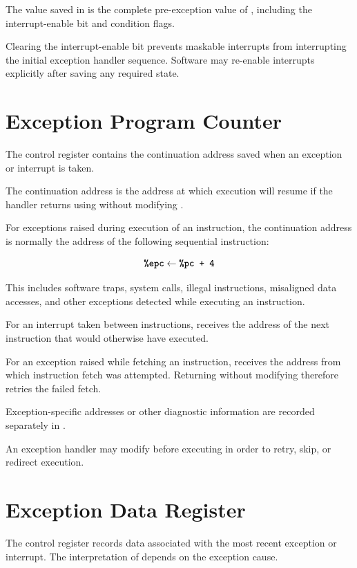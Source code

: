 The value saved in  is the complete pre-exception value of
, including the interrupt-enable bit and condition flags.

\noindent
Clearing the interrupt-enable bit prevents maskable interrupts from
interrupting the initial exception handler sequence. Software may
re-enable interrupts explicitly after saving any required state.

\section{Exception Program Counter}

The  control register contains the continuation address saved when an exception
or interrupt is taken.

The continuation address is the address at which execution will resume if the handler returns
using  without modifying .

For exceptions raised during execution of an instruction, the continuation address is normally
the address of the following sequential instruction:

$$
\textbf{\texttt{\%epc}} \leftarrow \textbf{\texttt{\%pc + 4}}
$$

This includes software traps, system calls, illegal instructions, misaligned data accesses,
and other exceptions detected while executing an instruction.

For an interrupt taken between instructions,  receives the address of the next
instruction that would otherwise have executed.

For an exception raised while fetching an instruction,  receives the address from
which instruction fetch was attempted. Returning without modifying  therefore
retries the failed fetch.

Exception-specific addresses or other diagnostic information are recorded separately in
.

An exception handler may modify  before executing  in order to retry,
skip, or redirect execution.

\section{Exception Data Register}

The  control register records data associated with the most recent
exception or interrupt.
The interpretation of  depends on the exception cause.

